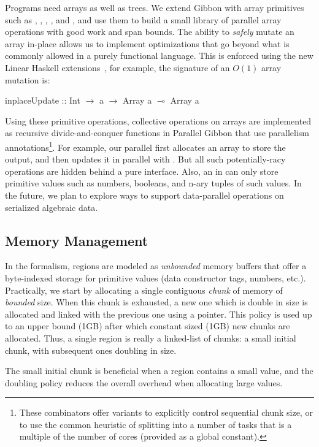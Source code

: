 \documentclass[acmsmall,acmthm=false,nonacm]{acmart}
\theoremstyle{straighttext0}
\theoremstyle{straighttext}
\newcommand{\new}[1]{#1}
\begin{document}
{Programs need arrays as well as trees.
We extend Gibbon with array primitives such as
, , , , and ,
and use them to build a small library of parallel array operations with
good work and span bounds.
%
The ability to {\em safely} mutate an array in-place allows us to implement optimizations
that go beyond what is commonly allowed in a purely functional language.
%
This is enforced using the new Linear Haskell extensions~\cite{linear-haskell}, for example, the signature of an $O(1)$ array mutation is:
\begin{code}
inplaceUpdate :: Int $\rightarrow$ a $\rightarrow$ Array a $\multimap$ Array a  
\end{code}
%
Using these primitive operations, collective operations on arrays are implemented as recursive
  divide-and-conquer functions in Parallel Gibbon that use parallelism annotations\footnote{These combinators offer variants to explicitly control sequential chunk size, or to use the common heuristic of splitting into a number of tasks that is a multiple of the number of cores (provided as a global constant).}.
%
For example, our parallel  first allocates an array to store the output,
and then updates it in parallel with .
%
But all such potentially-racy operations are hidden behind a pure interface.
%
Also, an  in \pargibbon{} can only store primitive values such as
numbers, booleans, and n-ary tuples of such values.
%
In the future, we plan to explore ways to support data-parallel operations
on serialized algebraic data.


\subsection{Memory Management}

In the formalism,
regions are modeled as {\em unbounded} memory buffers that offer a byte-indexed storage
for primitive values (data constructor tags, numbers, etc.).
%
Practically, we start by allocating a single contiguous {\em chunk} of memory of {\em bounded} size.
%
When this chunk is exhausted, a new one which is double in size is allocated
and linked with the previous one using a pointer.
%
\new{This policy is used up to an upper bound (1GB)
after which constant sized (1GB) new chunks are allocated.}
%
Thus, a single region is really a linked-list of chunks:
a small initial chunk, with subsequent ones doubling in size.
%
\new{
The small initial chunk is beneficial when a region contains a small value,
and the doubling policy reduces the overall \il{malloc} overhead when
allocating large values.
}

}
\end{document}
